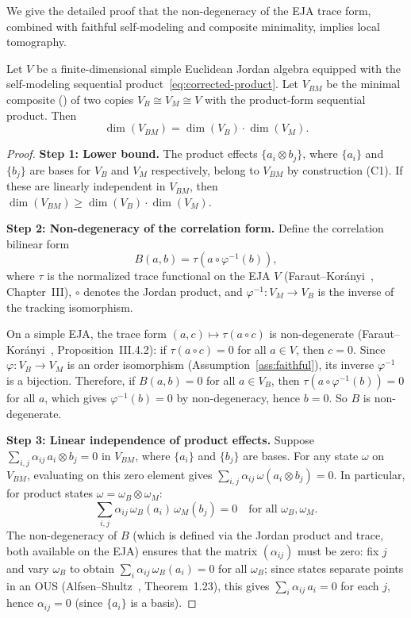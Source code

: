 We give the detailed proof that the non-degeneracy of the EJA trace
form, combined with faithful self-modeling and composite minimality,
implies local tomography.

\begin{theorem}\label{thm:lt-full}
Let $V$ be a finite-dimensional simple Euclidean Jordan algebra
equipped with the self-modeling sequential
product~\eqref{eq:corrected-product}.  Let $V_{BM}$ be the minimal
composite () of two copies $V_{B} \cong V_{M}
\cong V$ with the product-form sequential product.  Then
\[
  \dim(V_{BM}) = \dim(V_{B}) \cdot \dim(V_{M}).
\]
\end{theorem}

\begin{proof}
\textbf{Step 1: Lower bound.}
The product effects $\{a_{i} \otimes b_{j}\}$, where $\{a_{i}\}$ and
$\{b_{j}\}$ are bases for $V_{B}$ and $V_{M}$ respectively, belong to
$V_{BM}$ by construction (C1).  If these are linearly independent in
$V_{BM}$, then $\dim(V_{BM}) \geq \dim(V_{B}) \cdot \dim(V_{M})$.

\medskip
\textbf{Step 2: Non-degeneracy of the correlation form.}
Define the correlation bilinear form
\[
  B(a, b) = \tau\!\left(a \circ \varphi^{-1}(b)\right),
\]
where $\tau$ is the normalized trace functional on the EJA $V$
(Faraut--Kor\'anyi~\cite{FarautKoranyi1994}, Chapter~III), $\circ$
denotes the Jordan product, and $\varphi^{-1}: V_{M} \to V_{B}$ is
the inverse of the tracking isomorphism.

On a simple EJA, the trace form $(a, c) \mapsto \tau(a \circ c)$ is
non-degenerate (Faraut--Kor\'anyi~\cite{FarautKoranyi1994},
Proposition~III.4.2): if $\tau(a \circ c) = 0$ for all $a \in V$,
then $c = 0$.  Since $\varphi: V_{B} \to V_{M}$ is an order
isomorphism (Assumption~\ref{ass:faithful}), its inverse
$\varphi^{-1}$ is a bijection.  Therefore, if $B(a, b) = 0$ for all
$a \in V_{B}$, then $\tau(a \circ \varphi^{-1}(b)) = 0$ for all $a$,
which gives $\varphi^{-1}(b) = 0$ by non-degeneracy, hence $b = 0$.
So $B$ is non-degenerate.

\medskip
\textbf{Step 3: Linear independence of product effects.}
Suppose $\sum_{i,j} \alpha_{ij}\, a_{i} \otimes b_{j} = 0$ in
$V_{BM}$, where $\{a_{i}\}$ and $\{b_{j}\}$ are bases.  For any
state $\omega$ on $V_{BM}$, evaluating on this zero element gives
$\sum_{i,j} \alpha_{ij}\, \omega(a_{i} \otimes b_{j}) = 0$.
In particular, for product states
$\omega = \omega_{B} \otimes \omega_{M}$:
\[
  \sum_{i,j} \alpha_{ij}\, \omega_{B}(a_{i})\, \omega_{M}(b_{j}) = 0
  \quad \text{for all } \omega_{B}, \omega_{M}.
\]
The non-degeneracy of $B$ (which is defined via the Jordan product and
trace, both available on the EJA) ensures that the matrix
$(\alpha_{ij})$ must be zero: fix $j$ and vary $\omega_{B}$ to obtain
$\sum_{i} \alpha_{ij}\, \omega_{B}(a_{i}) = 0$ for all
$\omega_{B}$; since states separate points in an OUS
(Alfsen--Shultz~\cite{AlfsenShultz2003}, Theorem~1.23), this gives
$\sum_{i} \alpha_{ij}\, a_{i} = 0$ for each $j$, hence
$\alpha_{ij} = 0$ (since $\{a_{i}\}$ is a basis).


\end{proof}
